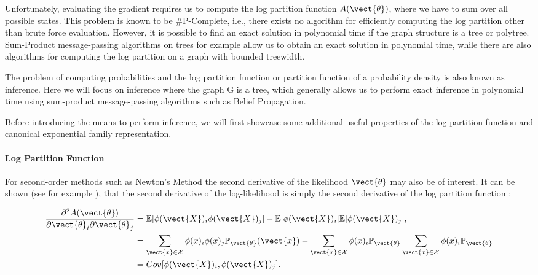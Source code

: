     Unfortunately, evaluating the gradient requires us to compute the log partition function $A(\vect{\theta})$, where we have to sum over all possible states.
    This problem is known to be \#P-Complete, i.e., there exists no algorithm for efficiently computing the log partition other than brute force evaluation.
    However, it is possible to find an exact solution in polynomial time if the graph structure is a tree or polytree.
    Sum-Product message-passing algorithms on trees for example allow us to obtain an exact solution in polynomial time, while there are also algorithms for computing the log partition on a graph with bounded treewidth\cite{berg2014learning}.

    The problem of computing probabilities and the log partition function or partition function of a probability density is also known as inference.
    Here we will focus on inference where the graph G is a tree, which generally allows us to perform exact inference in polynomial time using sum-product message-passing algorithms such as Belief Propagation.

    Before introducing the means to perform inference, we will first showcase some additional useful properties of the log partition function and canonical exponential family representation.
    
    \paragraph*{Log Partition Function}
    For second-order methods such as Newton's Method the second derivative of the likelihood \wrt $\vect{\theta}$ may also be of interest.
    It can be shown (see for example \cite{piatkowski2018exponential}), that the second derivative of the log-likelihood is simply the second derivative of the log partition function :

    \begin{equation}
        \label{eq:sparsefish}
        \begin{split}
        \frac{\partial^2 A(\vect{\theta})}{\partial \vect{\theta}_i \partial \vect{\theta}_j} &= \mathbb{E}[\phi(\vect{X})_i \phi(\vect{X})_j] - \mathbb{E}[\phi(\vect{X})_i] \mathbb{E}[\phi(\vect{X})_j], \\
        &= \sum_{\vect{x} \in \mathcal{X}} \phi(x)_i \phi(x)_j \mathbb{P}_{\vect{\theta}}(\vect{x}) - \sum_{\vect{x} \in \mathcal{X}} \phi(x)_i \mathbb{P}_{\vect{\theta}} \sum_{\vect{x} \in \mathcal{X}} \phi(x)_i  \mathbb{P}_{\vect{\theta}} \\
        &= Cov[\phi(\vect{X})_i, \phi(\vect{X})_j].
        \end{split}
    \end{equation}

